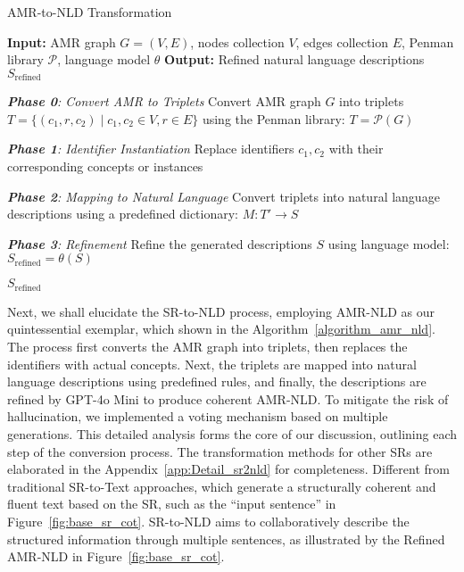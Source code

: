 \begin{algorithm}
\normalsize
    \caption{AMR-to-NLD Transformation}
    \label{algorithm_amr_nld}
    \begin{algorithmic}[1]
        \State \textbf{Input:} AMR graph $G = (V, E)$, nodes collection $V$, edges collection $E$, Penman library $\mathcal{P}$, language model $\theta$
        \State \textbf{Output:} Refined natural language descriptions $S_{\text{refined}}$
        
        \State \emph{\textbf{Phase 0}: Convert AMR to Triplets}
            \State Convert AMR graph $G$ into triplets $T = \{(c_1, r, c_2) \mid c_1, c_2 \in V, r \in E\}$ using the Penman library: $T=\mathcal{P}(G)$
        
        \State \emph{\textbf{Phase 1}: Identifier Instantiation}
                    \State Replace identifiers $c_1, c_2$ with their corresponding concepts or instances
                \EndIf
            \EndFor

        \State \emph{\textbf{Phase 2}: Mapping to Natural Language}
            \State Convert triplets into natural language descriptions using a predefined dictionary: $M: T' \rightarrow S$
        
        \State \emph{\textbf{Phase 3}: Refinement}
            \State Refine the generated descriptions $S$ using language model: $S_{\text{refined}} = \theta (S)$
        
        \State \Return $S_{\text{refined}}$
    \end{algorithmic}
\end{algorithm}

Next, we shall elucidate the SR-to-NLD process, employing AMR-NLD as our quintessential exemplar, which shown in the Algorithm~\ref{algorithm_amr_nld}. The process first converts the AMR graph into triplets, then replaces the identifiers with actual concepts. Next, the triplets are mapped into natural language descriptions using predefined rules, and finally, the descriptions are refined by GPT-4o Mini to produce coherent AMR-NLD. To mitigate the risk of hallucination, we implemented a voting mechanism based on multiple generations. This detailed analysis forms the core of our discussion, outlining each step of the conversion process. The transformation methods for other SRs are elaborated in the Appendix~\ref{app:Detail_sr2nld} for completeness. Different from traditional SR-to-Text approaches, which generate a structurally coherent and fluent text based on the SR, such as the ``input sentence'' in Figure~\ref{fig:base_sr_cot}. SR-to-NLD aims to collaboratively describe the structured information through multiple sentences, as illustrated by the Refined AMR-NLD in Figure~\ref{fig:base_sr_cot}.

